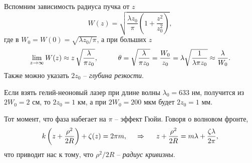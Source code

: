 Вспомним зависимость радиуса пучка от $z$
\begin{equation*}
    W(z) = \sqrt{
        \frac{\lambda z_0}{\pi} \left(
            1 + \frac{z^2}{z_0^2}
        \right)
    },
\end{equation*}
где в $W_0 = W(0) = \sqrt{ \lambda z_0 / \pi}$, а при больших $z$ 
\begin{equation*}
     \lim_{z \to \infty} W(z) \approx z\, \sqrt{\frac{\lambda}{\pi z_0}},
     \hspace{1 cm}
     \theta = \sqrt{\frac{\lambda}{\pi z_0}} = \frac{W_0}{z_0} = 
     \lambda \sqrt{\frac{1}{\lambda \pi z_0}} \approx \frac{\lambda}{W_0}
     .
 \end{equation*} 
Также можно указать $2 z_0$ -- \textit{глубина резкости}. 

Если взять гелий-неоновый лазер при длине волны $\lambda_0 = 633$ нм, получится из $2 W_0 = 2$ см, то $2 z_0 = 1$ км, а при $2 W_0 = 200$ мкм будет $2 z_0 = 1$ мм.

Тот момент, что фаза набегает на $\pi$ -- эффект Гюйи. Говоря о волновом фронте,
\begin{equation*}
    k \left(z + \frac{\rho^2}{2R}\right) + \zeta(z) = 2 \pi m,
    \hspace{0.5cm} \Rightarrow \hspace{0.5cm}
    z + \frac{\rho^2}{2R} = m \lambda + \frac{\zeta \lambda}{2 \pi},
\end{equation*}
что приводит нас к тому, что $\rho^2 / 2 R$ -- \textit{радиус кривизны}.



